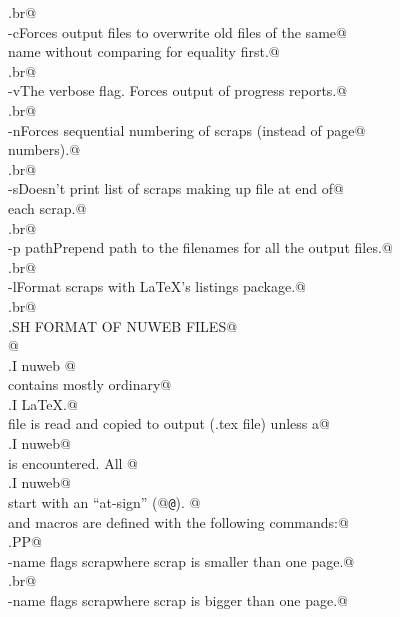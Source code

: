 \documentclass{report}
\begin{document}
\begin{flushleft}
\begin{list}{}{}
\mbox{}\verb@.br@\\
\mbox{}\verb@\fB-c\fP Forces output files to overwrite old files of the same@\\
\mbox{}\verb@  name without comparing for equality first.@\\
\mbox{}\verb@.br@\\
\mbox{}\verb@\fB-v\fP The verbose flag. Forces output of progress reports.@\\
\mbox{}\verb@.br@\\
\mbox{}\verb@\fB-n\fP Forces sequential numbering of scraps (instead of page@\\
\mbox{}\verb@  numbers).@\\
\mbox{}\verb@.br@\\
\mbox{}\verb@\fB-s\fP Doesn't print list of scraps making up file at end of@\\
\mbox{}\verb@  each scrap.@\\
\mbox{}\verb@.br@\\
\mbox{}\verb@\fB-p path\fP Prepend path to the filenames for all the output files.@\\
\mbox{}\verb@.br@\\
\mbox{}\verb@\fB-l\fP Format scraps with LaTeX's listings package.@\\
\mbox{}\verb@.br@\\
\mbox{}\verb@.SH FORMAT OF NUWEB FILES@\\
\mbox{}\verb@A @\\
\mbox{}\verb@.I nuweb @\\
\mbox{}\verb@file contains mostly ordinary@\\
\mbox{}\verb@.I LaTeX.@\\
\mbox{}\verb@The file is read and copied to output (.tex file) unless a@\\
\mbox{}\verb@.I nuweb@\\
\mbox{}\verb@command is encountered. All @\\
\mbox{}\verb@.I nuweb@\\
\mbox{}\verb@commands start with an ``at-sign'' (@{\tt @}\verb@). @\\
\mbox{}\verb@Files and macros are defined with the following commands:@\\
\mbox{}\verb@.PP@\\
\mbox{}\verb@o \fIfile-name flags  scrap\fP  where scrap is smaller than one page.@\\
\mbox{}\verb@.br@\\
\mbox{}\verb@O \fIfile-name flags  scrap\fP  where scrap is bigger than one page.@\\

\end{list}
\end{flushleft}
\end{document}
